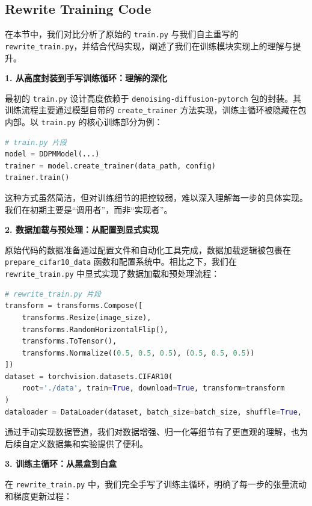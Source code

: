 \documentclass{ctexart}
\begin{document}
\subsection{Rewrite Training Code}
\noindent
在本节中，我们对比分析了原始的 \texttt{train.py} 与我们自主重写的 \texttt{rewrite\_train.py}，并结合代码实现，阐述了我们在训练模块实现上的理解与提升。

\vspace{0.5em}
\noindent
\textbf{1. 从高度封装到手写训练循环：理解的深化}

\noindent
最初的 \texttt{train.py} 设计高度依赖于 \texttt{denoising-diffusion-pytorch} 包的封装。其训练流程主要通过模型自带的 \texttt{create\_trainer} 方法实现，训练主循环被隐藏在包内部。以 \texttt{train.py} 的核心训练部分为例：

\begin{lstlisting}[language=python]
# train.py 片段
model = DDPMModel(...)
trainer = model.create_trainer(data_path, config)
trainer.train()
\end{lstlisting}

\noindent
这种方式虽然简洁，但对训练细节的把控较弱，难以深入理解每一步的具体实现。我们在初期主要是“调用者”，而非“实现者”。

\vspace{0.5em}
\noindent
\textbf{2. 数据加载与预处理：从配置到显式实现}

\noindent
原始代码的数据准备通过配置文件和自动化工具完成，数据加载逻辑被包裹在 \texttt{prepare\_cifar10\_data} 函数和配置系统中。相比之下，我们在 \texttt{rewrite\_train.py} 中显式实现了数据加载和预处理流程：

\begin{lstlisting}[language=python]
# rewrite_train.py 片段
transform = transforms.Compose([
    transforms.Resize(image_size),
    transforms.RandomHorizontalFlip(),
    transforms.ToTensor(),
    transforms.Normalize((0.5, 0.5, 0.5), (0.5, 0.5, 0.5))
])
dataset = torchvision.datasets.CIFAR10(
    root='./data', train=True, download=True, transform=transform
)
dataloader = DataLoader(dataset, batch_size=batch_size, shuffle=True, ...)
\end{lstlisting}

\noindent
通过手动实现数据管道，我们对数据增强、归一化等细节有了更直观的理解，也为后续自定义数据集和实验提供了便利。

\vspace{0.5em}
\noindent
\textbf{3. 训练主循环：从黑盒到白盒}

\noindent
在 \texttt{rewrite\_train.py} 中，我们完全手写了训练主循环，明确了每一步的张量流动和梯度更新过程：
\end{document}
